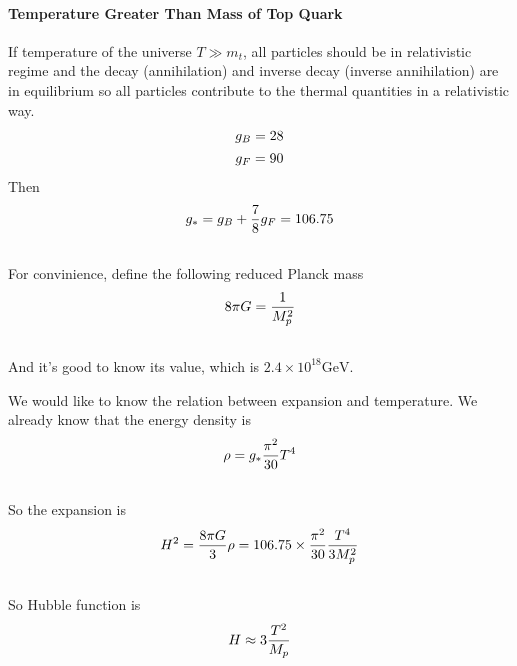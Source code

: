 \documentclass[letterpaper,10pt,english]{sphinxmanual}
\begin{document}
{\paragraph{Temperature Greater Than Mass of Top Quark}
\label{Cosmology/cosmoIndex:temperature-greater-than-mass-of-top-quark}
If temperature of the universe $T \gg m_t$, all particles should be in relativistic regime and the decay (annihilation) and inverse decay (inverse annihilation) are in equilibrium so all particles contribute to the thermal quantities in a relativistic way.
\begin{gather}
\begin{split}g_B = 28\end{split}\notag\\\begin{split}g_F = 90\end{split}\notag
\end{gather}
Then
\begin{gather}
\begin{split}g _ * = g_B + \frac{7}{8} g _ F = 106.75\end{split}\notag\\\begin{split}\end{split}\notag
\end{gather}
For convinience, define the following reduced Planck mass
\begin{gather}
\begin{split}8\pi G = \frac{1}{M _ p ^2}\end{split}\notag\\\begin{split}\end{split}\notag
\end{gather}
And it's good to know its value, which is $2.4\times 10^{18} \mathrm{GeV}$.

We would like to know the relation between expansion and temperature. We already know that the energy density is
\begin{gather}
\begin{split}\rho = g _ * \frac{\pi^2}{30} T^4\end{split}\notag\\\begin{split}\end{split}\notag
\end{gather}
So the expansion is
\begin{gather}
\begin{split}H^2 = \frac{8\pi G}{3}\rho = 106.75 \times \frac{\pi^2}{30} \frac{T^4}{3 M_p^2}\end{split}\notag\\\begin{split}\end{split}\notag
\end{gather}
So Hubble function is
\begin{gather}
\begin{split}H \approx 3 \frac{T^2}{M_p}\end{split}\notag\\\begin{split}\end{split}\notag
\end{gather}

}
\end{document}
